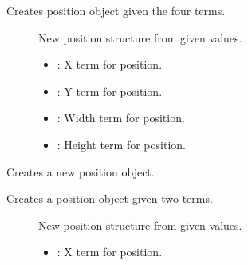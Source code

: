 \documentclass[letterpaper,10pt,english]{sphinxmanual}
\begin{document}
\begin{fulllineitems}
\begin{fulllineitems}
Creates position object given the four terms. \begin{description}
\item[{}] \leavevmode
{\hyperref[\detokenize{index:Pessumstructostendo_1_1Pos}]{}} New position structure from given values. 

\item[{}] \leavevmode\begin{itemize}
\item {} 
: X term for position. 

\item {} 
: Y term for position. 

\item {} 
: Width term for position. 

\item {} 
: Height term for position. 

\end{itemize}

\end{description}


\end{fulllineitems}


\begin{fulllineitems}
\label{\detokenize{index:_CPPv2N7ostendo8make_posEii}}%
\pysigstartmultiline
{}\label{\detokenize{index:Pessumnamespaceostendo_1a182badf5647b8bae4d48aa1e447b9d80}}%
\pysigstopmultiline
Creates a new position object. 

Creates a position object given two terms. \begin{description}
\item[{}] \leavevmode
{\hyperref[\detokenize{index:Pessumstructostendo_1_1Pos}]{}} New position structure from given values. 

\item[{}] \leavevmode\begin{itemize}
\item {} 
: X term for position. 


\end{itemize}
\end{description}
\end{fulllineitems}
\end{fulllineitems}
\end{document}
